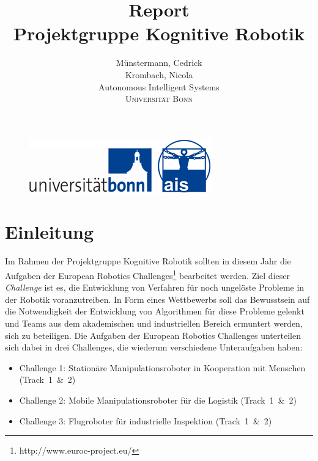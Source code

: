 \documentclass[12pt,titlepage, a4paper]{article}
\begin{document}
\begin{figure}
 \centering
 \includegraphics[width=298px,keepaspectratio=true]{./Screens/logo_uni_bonn_ais.png}
\end{figure}


\title{Report\vspace{5mm}\\\textbf{Projektgruppe Kognitive Robotik}\vspace{1cm}}


\author{Münstermann,  Cedrick\\  Krombach, Nicola\\[1cm]
	Autonomous Intelligent Systems\\ \textsc{Universität Bonn}\\}



\maketitle

\clearpage \thispagestyle{empty} \mbox{}\clearpage
 \setcounter{page}{1}



\section{Einleitung}

Im Rahmen der Projektgruppe Kognitive Robotik sollten in diesem Jahr die Aufgaben der European Robotics Challenges\footnote{http://www.euroc-project.eu/} bearbeitet werden.
Ziel dieser \textit{Challenge} ist es, die Entwicklung von Verfahren für noch ungelöste Probleme in der Robotik voranzutreiben.
In Form eines Wettbewerbs soll das Bewusstsein auf die Notwendigkeit der Entwicklung von Algorithmen für diese Probleme gelenkt und Teams aus dem akademischen und industriellen Bereich ermuntert werden, sich zu beteiligen.
Die Aufgaben der European Robotics Challenges unterteilen sich dabei in drei Challenges, die wiederum verschiedene Unteraufgaben haben:

\begin{itemize}
 \item Challenge 1: Stationäre Manipulationsroboter in Kooperation mit Menschen \mbox{(Track 1 \& 2)}
 \item Challenge 2: Mobile Manipulationsroboter für die Logistik \mbox{(Track 1 \& 2)}
 \item Challenge 3: Flugroboter für industrielle Inspektion \mbox{(Track 1 \& 2)}
\end{itemize}
\end{document}
